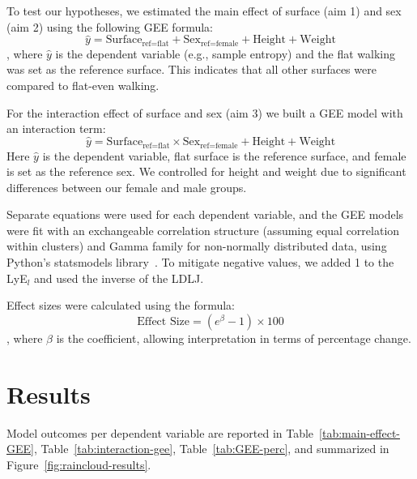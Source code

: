 \documentclass[authoryear,preprint,review,12pt]{elsarticle}
\begin{document}
To test our hypotheses, we estimated the main effect of surface (aim 1) and sex (aim 2) using the following GEE formula: 
\begin{equation}
    \hat{y} = \text{Surface}_{\text{ref=flat}} + \text{Sex}_{\text{ref=female}} + \text{Height} + \text{Weight}
\end{equation}
, where $\hat{y}$ is the dependent variable (e.g., sample entropy) and the flat walking was set as the reference surface. This indicates that all other surfaces were compared to flat-even walking. 

For the interaction effect of surface and sex (aim 3) we built a GEE model with an interaction term: 
\begin{equation}
    \hat{y} = \text{Surface}_{\text{ref=flat}} \times \text{Sex}_{\text{ref=female}} + \text{Height} + \text{Weight}
\end{equation}
Here $\hat{y}$ is the dependent variable, flat surface is the reference surface, and female is set as the reference sex. 
We controlled for height and weight due to significant differences between our female and male groups.

Separate equations were used for each dependent variable, and the GEE models were fit with an exchangeable correlation structure (assuming equal correlation within clusters) and Gamma family for non-normally distributed data, using Python's statsmodels library~\citep{seabold2010statsmodels}. To mitigate negative values, we added 1 to the LyE$_{l}$ and used the inverse of the LDLJ. 

Effect sizes were calculated using the formula: 
\begin{equation}
    \text{Effect Size} = (e^{\beta} - 1) \times 100
\end{equation}
, where $\beta$ is the coefficient, allowing interpretation in terms of percentage change. 


\section{Results}
\label{results}
Model outcomes per dependent variable are reported in Table~\ref{tab:main-effect-GEE}, Table~\ref{tab:interaction-gee}, Table~\ref{tab:GEE-perc}, and summarized in Figure~\ref{fig:raincloud-results}.
\end{document}
